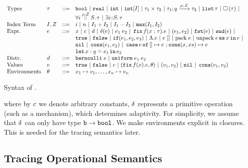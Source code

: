\documentclass[acmsmall,review,anonymous]{acmart}\settopmatter{printfolios=true,printccs=false,printacmref=false}
\begin{document}
\begin{table}
\[\begin{array}{llll}
  \mbox{Types} & \type & ::= & \tbool ~|~  \treal ~|~  \tint ~|~   \tint[I] ~|~ \type_1 \times
  \type_2 ~|~ \tarr{\type_1}{\type_2}{\nnatbiA}{\dmap}{\nnatA} ~|~
                              \tlist{\type} ~|~ \tbox{\type}~|~ \\
& & &                      \tforall{\dmap}{\nnatA}{i} \type  ~|~ \texists{i} \type\\
\mbox{Index Term} & \idx, \nnatA & ::= &     i ~|~ n ~|~ \idx_1 + \idx_2 ~|~  \idx_1
                                 - \idx_2 ~|~ \smax{\idx_1}{\idx_2}\\
\mbox{Expr.} & \expr & ::= & x ~|~ \econst ~|~ \distr ~|~ \eop(\expr) ~|~ \expr_1 \eapp \expr_2 ~|~ \efix f(x:\tau).\expr
 ~|~ (\expr_1, \expr_2) ~|~ \eprojl(\expr) ~|~ \eprojr(\expr) ~| \\
%
& & & \etrue ~|~ \efalse ~|~ \eif(\expr_1, \expr_2, \expr_3) ~|~ \eilam \expr  ~|~  \expr \eapp []  ~|~
                            \epack \expr ~|~ \eunpack \expr \eas x
                            \ein \expr ~|~
\\
& & &  \enil ~|~  \econs (
      \expr_1, \expr_2) ~|~ 
      \ecase \expr \eof\, []\mapsto\expr~;\econs(x,xs)\mapsto\expr\\
& & &  \elet  x:q = \expr_1 \ein \expr_2\\
%
\mbox{Distr.} & \distr & ::= & \bernoulli \eapp \expr ~|~ \uniform \eapp \expr_1 \eapp \expr_2\\      
\mbox{Values} & \valr & ::= & \etrue ~|~ \efalse ~|~ \econst ~|~
(\efix f(x).\expr, \env) ~|~ (\valr_1, \valr_2) 
    ~|~ \enil ~|~ \econs (\valr_1, \valr_2)\\
\mbox{Environments} & \env & ::= & x_1 \mapsto \valr_1, \ldots, x_n \mapsto \valr_n\\
\end{array}\]
\caption{Syntax of \THESYSTEM.}
\label{tab:syntax}
\end{table}
where by $c$ we denote arbitrary constants, $\delta$ represents a primitive operation (such as a
mechanism), which determines adaptivity. For simplicity, we assume
that $\delta$ can only have type $\mathtt{b} \to \mathtt{bool}$. We make
environments explicit in closures. This is needed for the tracing
semantics later.
\subsection{Tracing Operational Semantics}
\end{document}
